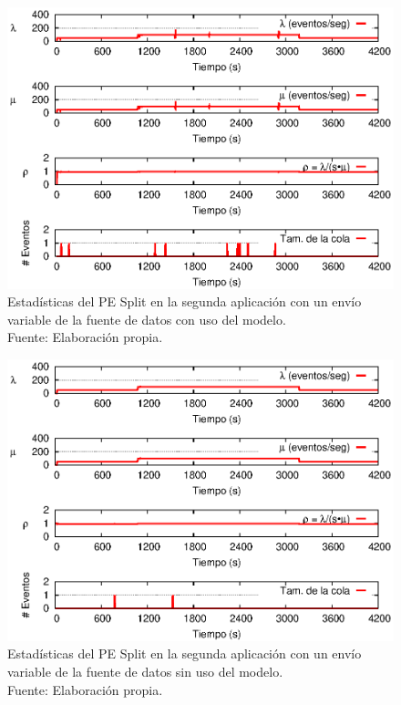 \begin{figure}[!ht]
    \centering
    \captionsetup{justification=centering}
    \includegraphics[scale=1]{images/exp/app2/normal/cm/statusSplitPE.eps}
    \caption[Estad\'isticas del PE Split en la segunda aplicaci\'on con un env\'io variable de la fuente de datos con uso del modelo.]{Estad\'isticas del PE Split en la segunda aplicaci\'on con un env\'io variable de la fuente de datos con uso del modelo.\\Fuente: Elaboraci\'on propia.}
    \label{fig:app2-normal-statusSplitPE-cm}
\end{figure}

\begin{figure}[!ht]
    \centering
    \captionsetup{justification=centering}
    \includegraphics[scale=1]{images/exp/app2/normal/sm/statusSplitPE.eps}
    \caption[Estad\'isticas del PE Split en la segunda aplicaci\'on con un env\'io variable de la fuente de datos sin uso del modelo.]{Estad\'isticas del PE Split en la segunda aplicaci\'on con un env\'io variable de la fuente de datos sin uso del modelo.\\Fuente: Elaboraci\'on propia.}
    \label{fig:app2-normal-statusSplitPE-sm}
\end{figure}

